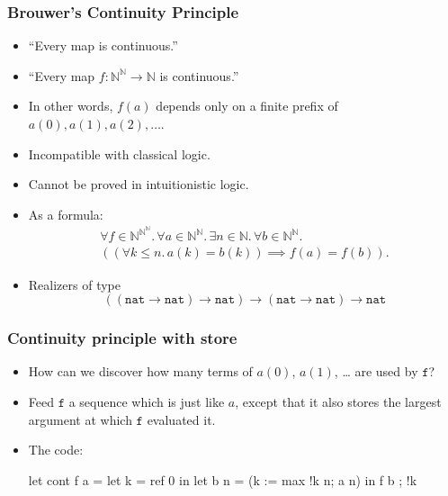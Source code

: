 \documentclass[t]{beamer}
\newcommand{\NN}{\mathbb{N}}
\newcommand{\nat}{\mathtt{nat}}
\begin{document}
\begin{frame}
  \frametitle{Brouwer's Continuity Principle}

  \begin{itemize}
  \item ``Every map is continuous.''
  \item ``Every map $f : \NN^\NN \to \NN$ is continuous.''
  \item 
    In other words, $f(a)$ depends only on a finite prefix of
    $a(0), a(1), a(2), \ldots$.
  \item Incompatible with classical logic.
  \item Cannot be proved in intuitionistic logic.
  \item As a formula:
    \begin{multline*}
      \forall f \in \NN^{\NN^\NN} .\,
      \forall a \in  \NN^\NN.\,
      \exists n \in \NN .\,
      \forall b \in \NN^\NN .\,\\
      ((\forall k \leq n .\, a(k) = b(k)) \implies f(a) = f(b)).
    \end{multline*}
  \item Realizers of type
    \begin{equation*}
      ((\nat \to \nat) \to \nat) \to (\nat \to \nat) \to \nat
    \end{equation*}
  \end{itemize}
\end{frame}

\begin{frame}[fragile]
  \frametitle{Continuity principle with store}

  \begin{itemize}
  \item How can we discover how many terms of $a(0)$, $a(1)$, \dots
    are used by $\mathtt{f}$?
  \item Feed $\mathtt{f}$ a sequence which is just like $a$, except
    that it also stores the largest argument at which $\mathtt{f}$
    evaluated it.
  \item The code:
\begin{source}
let cont f a =
  let k = ref 0 in
  let b n = (k := max !k n; a n) in
    f b ; !k
\end{source}
  \end{itemize}

\end{frame}
\end{document}
